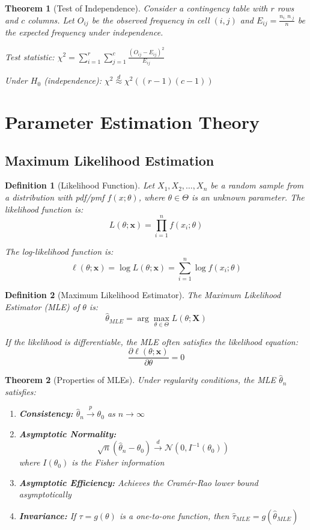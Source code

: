 \documentclass[12pt,a4paper]{article}
\newtheorem{theorem}{Theorem}[section]
\newtheorem{definition}{Definition}[section]
\theoremstyle{remark}
\begin{document}
\begin{theorem}[Test of Independence]
Consider a contingency table with $r$ rows and $c$ columns. Let $O_{ij}$ be the observed frequency in cell $(i,j)$ and $E_{ij} = \frac{n_{i \cdot} n_{\cdot j}}{n}$ be the expected frequency under independence.

Test statistic: $\chi^2 = \sum_{i=1}^r \sum_{j=1}^c \frac{(O_{ij} - E_{ij})^2}{E_{ij}}$

Under $H_0$ (independence): $\chi^2 \stackrel{d}{\approx} \chi^2((r-1)(c-1))$
\end{theorem}

\section{Parameter Estimation Theory}

\subsection{Maximum Likelihood Estimation}

\begin{definition}[Likelihood Function]
Let $X_1, X_2, \ldots, X_n$ be a random sample from a distribution with pdf/pmf $f(x; \theta)$, where $\theta \in \Theta$ is an unknown parameter. The likelihood function is:
$$L(\theta; \mathbf{x}) = \prod_{i=1}^n f(x_i; \theta)$$

The log-likelihood function is:
$$\ell(\theta; \mathbf{x}) = \log L(\theta; \mathbf{x}) = \sum_{i=1}^n \log f(x_i; \theta)$$
\end{definition}

\begin{definition}[Maximum Likelihood Estimator]
The Maximum Likelihood Estimator (MLE) of $\theta$ is:
$$\hat{\theta}_{MLE} = \arg\max_{\theta \in \Theta} L(\theta; \mathbf{X})$$

If the likelihood is differentiable, the MLE often satisfies the likelihood equation:
$$\frac{\partial \ell(\theta; \mathbf{x})}{\partial \theta} = 0$$
\end{definition}

\begin{theorem}[Properties of MLEs]
Under regularity conditions, the MLE $\hat{\theta}_n$ satisfies:
\begin{enumerate}
\item \textbf{Consistency:} $\hat{\theta}_n \stackrel{p}{\to} \theta_0$ as $n \to \infty$
\item \textbf{Asymptotic Normality:} 
   $$\sqrt{n}(\hat{\theta}_n - \theta_0) \stackrel{d}{\to} \mathcal{N}(0, I^{-1}(\theta_0))$$
   where $I(\theta_0)$ is the Fisher information
\item \textbf{Asymptotic Efficiency:} Achieves the Cramér-Rao lower bound asymptotically
\item \textbf{Invariance:} If $\tau = g(\theta)$ is a one-to-one function, then $\hat{\tau}_{MLE} = g(\hat{\theta}_{MLE})$
\end{enumerate}
\end{theorem}
\end{document}
